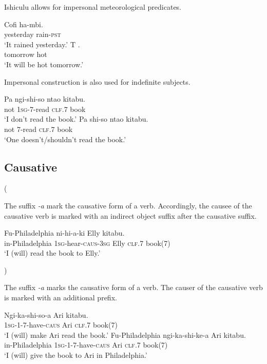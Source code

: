 Ishiculu allows for impersonal meteorological predicates.

\begin{exe}
\ex
\gll Cofi ha-mbi. \\
yesterday rain-\textsc{pst} \\
\trans `It rained yesterday.'
\ex
\gll T . \\
tomorrow hot \\
\trans `It will be hot tomorrow.'
\end{exe}

Impersonal construction is also used for indefinite subjects.

\begin{exe}
\ex
\gll Pa ngi-shi-so nta\textbeltl o kitabu. \\
not \textsc{1sg}-\textsc{7}-read \textsc{clf}.7 book \\
\trans `I don't read the book.'
\ex
\gll Pa shi-so nta\textbeltl o kitabu. \\
not \textsc{7}-read \textsc{clf}.7 book \\
\trans `One doesn't/shouldn't read the book.'
\end{exe}

\subsection{Causative}

(


The suffix \textit{-\textbeltl a} mark the causative form of a verb. Accordingly, the causee of the causative verb is marked with an indirect object suffix after the causative suffix.

\begin{exe}
\ex
\gll Fu-Philadelphia ni-hi-\textipa{\textbeltl}a-ki Elly  kitabu. \\
in-Philadelphia \textsc{1sg}-hear-\textsc{caus}-\textsc{3sg} Elly \textsc{clf}.7 book(7) \\
\trans `I (will) read the book to Elly.'
\end{exe}

)


The suffix \textit{-\textbeltl a} marks the causative form of a verb. The causer of the causative verb is marked with an additional prefix.

\begin{exe}
\ex
\gll Ngi-ka-shi-so-\textipa{\textbeltl}a Ari  kitabu. \\
\textsc{1sg}-\textsc{1}-\textsc{7}-have-\textsc{caus} Ari \textsc{clf}.7 book(7) \\
\trans `I (will) make Ari read the book.'
\ex
\gll Fu-Philadelphia ngi-ka-shi-ke-\textipa{\textbeltl}a Ari  kitabu. \\
in-Philadelphia \textsc{1sg}-\textsc{1}-\textsc{7}-have-\textsc{caus} Ari \textsc{clf}.7 book(7) \\
\trans `I (will) give the book to Ari in Philadelphia.'
\end{exe}



